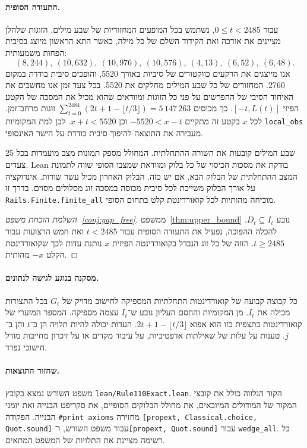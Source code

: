 \documentclass[11pt,a4paper]{article}
\DeclareRobustCommand{\textenglish}[1]{\foreignlanguage{english}{#1}}
\begin{document}
\paragraph{התעודה הסופית.}
עבור $0\le t<2485$, נשתמש בכל המופעים המחזוריות של שבע מילים. הזוגות שלהלן מציינים את אורכה ואת הקידוד השלם של כל מילה, כאשר התא הראשון מיוצג בסיבית הפחות משמעותית:
\[
(8,244),\ (10,632),\ (10,976),\ (10,576),\ (4,13),\ (6,52),\ (6,48).
\]
אנו מייצגים את הרקעים כווקטורים של סיביות באורך 5520, והופכים סיבית בודדת במקום 2760. המחזורים של כל שבע המילים מחלקים את 5520. בכל צעד זמן אנו מחשבים את האיחוד הסיבי של ההפרשים על פני כל הזוגות ומוודאים שהוא מכיל את המסכה של הקטע הפיזי $[-t,L(t)]$. כך מכוסים $\sum_{t=0}^{2484}(2t+1-\lfloor t/3\rfloor)=5\,147\,263$ זוגות מרחב־זמן. לכל $x$ בקטע זה מתקיים $-5520<x-t$ וכן $x+t<5520$. לכן למת המקומיות \textenglish{\texttt{local\_obs}} מעבירה את התוצאה להיפוך סיבית בודדת על הישר האינסופי.

שבע המילים קובעות את השורה ההתחלתית. המחולל מספק תמונות מצב מועמדות בכל 25 צעדים. \textenglish{Lean} בודקת את מסכות הכיסוי של כל בלוק ומוודאת שמצבו הסופי שווה לתמונת המצב ההתחלתית של הבלוק הבא, אם יש כזה. הבלוק האחרון מכיל עשר שורות. אינדוקציה על אורך הבלוק משייכת לכל סיבית מכוסה במסכה זוג מסלולים מסוים. בדרך זו \textenglish{\texttt{Rails.Finite.finite\_all}} מוכיחה מהותיות לכל קואורדינטת קלט בתחום הסופי.

\begin{proof}[השלמת הוכחת משפט~\ref{conj:gap_free}]
ממשפט~\ref{thm:upper_bound} נובע $D_t\subseteq I_t$. להכלה ההפוכה, נפעיל את התעודה הסופית עבור $t<2485$ ואת חמש הרצועות עבור $t\ge2485$. הזזה של כל זוג הנבדל בקואורדינטה הפיזית $x$ נותנת עדות לכך שקואורדינטת הקלט $-x$ מהותית.
\end{proof}

\paragraph{מסקנה בנוגע לגישה לנתונים.}
כל קבוצה קבועה של קואורדינטות התחלתיות המספיקה לחישוב מדויק של $G_t$ בכל התצורות מכילה את $I_t$. מן המקומיות והחסם העליון נובע ש־$I_t$ עצמה מספיקה. המספר המזערי של קואורדינטות בתצפית כזו הוא אפוא $2t+1-\lfloor t/3\rfloor$. העדות יכולה להיות תלויה הן ב־$t$ והן ב־$j$. טענות על עלות של שאילתות אדפטיביות, על עיבוד מקדים או על זיכרון מחייבות מודל חישובי נפרד.

\paragraph{שחזור התוצאות.}
משפט השורש נמצא בקובץ \textenglish{\texttt{lean/Rule110Exact.lean}}. הקוד הנלווה כולל את קובצי המקור של המודולים המיובאים, את מחולל הבלוקים הסופיים, את סקריפט הבנייה ואת יומני הבנייה. הפקודה \textenglish{\texttt{\#print axioms}} מחזירה \textenglish{\texttt{[propext, Classical.choice, Quot.sound]}} עבור משפט השורש, ו־\textenglish{\texttt{[propext, Quot.sound]}} עבור \textenglish{\texttt{wedge\_all}}. כל רשימה מציינת את התלויות של המשפט המתאים.
\end{document}
